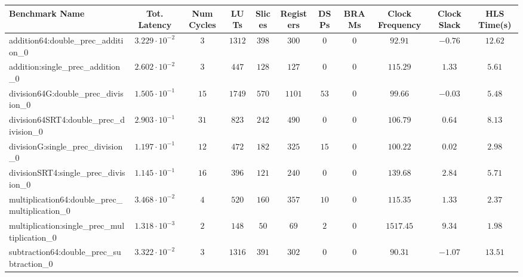 \begin{tabular}{|l|c|c|c|c|c|c|c|c|c|c|}
\hline
Benchmark Name                                   & Tot. Latency            & Num Cycles & LUTs     & Slices   & Registers & DSPs   & BRAMs & Clock Frequency & Clock Slack & HLS Time(s) \\
\hline
addition64:double\_prec\_addition\_0             & $ 3.229 \cdot 10^{-2} $ & $ 3      $ & $ 1312 $ & $ 398  $ & $ 300   $ & $ 0  $ & $ 0 $ & $ 92.91       $ & $ -0.76   $ & $ 12.62   $ \\
addition:single\_prec\_addition\_0               & $ 2.602 \cdot 10^{-2} $ & $ 3      $ & $ 447  $ & $ 128  $ & $ 127   $ & $ 0  $ & $ 0 $ & $ 115.29      $ & $ 1.33    $ & $ 5.61    $ \\
division64G:double\_prec\_division\_0            & $ 1.505 \cdot 10^{-1} $ & $ 15     $ & $ 1749 $ & $ 570  $ & $ 1101  $ & $ 53 $ & $ 0 $ & $ 99.66       $ & $ -0.03   $ & $ 5.48    $ \\
division64SRT4:double\_prec\_division\_0         & $ 2.903 \cdot 10^{-1} $ & $ 31     $ & $ 823  $ & $ 242  $ & $ 490   $ & $ 0  $ & $ 0 $ & $ 106.79      $ & $ 0.64    $ & $ 8.13    $ \\
divisionG:single\_prec\_division\_0              & $ 1.197 \cdot 10^{-1} $ & $ 12     $ & $ 472  $ & $ 182  $ & $ 325   $ & $ 15 $ & $ 0 $ & $ 100.22      $ & $ 0.02    $ & $ 2.98    $ \\
divisionSRT4:single\_prec\_division\_0           & $ 1.145 \cdot 10^{-1} $ & $ 16     $ & $ 396  $ & $ 121  $ & $ 240   $ & $ 0  $ & $ 0 $ & $ 139.68      $ & $ 2.84    $ & $ 5.71    $ \\
multiplication64:double\_prec\_multiplication\_0 & $ 3.468 \cdot 10^{-2} $ & $ 4      $ & $ 520  $ & $ 160  $ & $ 357   $ & $ 10 $ & $ 0 $ & $ 115.35      $ & $ 1.33    $ & $ 2.37    $ \\
multiplication:single\_prec\_multiplication\_0   & $ 1.318 \cdot 10^{-3} $ & $ 2      $ & $ 148  $ & $ 50   $ & $ 69    $ & $ 2  $ & $ 0 $ & $ 1517.45     $ & $ 9.34    $ & $ 1.98    $ \\
subtraction64:double\_prec\_subtraction\_0       & $ 3.322 \cdot 10^{-2} $ & $ 3      $ & $ 1316 $ & $ 391  $ & $ 302   $ & $ 0  $ & $ 0 $ & $ 90.31       $ & $ -1.07   $ & $ 13.51   $ \\

\end{tabular}
